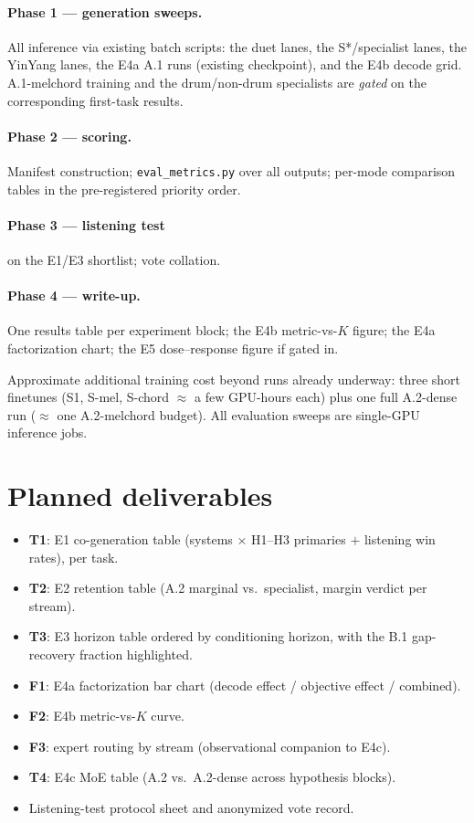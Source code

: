 \documentclass[11pt]{article}
\newcommand{\code}[1]{\texttt{#1}}
\begin{document}
\paragraph{Phase 1 --- generation sweeps.} All inference via existing
batch scripts: the duet lanes, the S*/specialist lanes, the YinYang
lanes, the E4a A.1 runs (existing checkpoint), and the E4b decode
grid. A.1-melchord training and the drum/non-drum specialists are
\emph{gated} on the corresponding first-task results.

\paragraph{Phase 2 --- scoring.} Manifest construction;
\code{eval\_metrics.py} over all outputs; per-mode comparison tables
in the pre-registered priority order.

\paragraph{Phase 3 --- listening test} on the E1/E3 shortlist; vote
collation.

\paragraph{Phase 4 --- write-up.} One results table per experiment
block; the E4b metric-vs-$K$ figure; the E4a factorization chart; the
E5 dose--response figure if gated in.

\medskip
\noindent Approximate additional training cost beyond runs already
underway: three short finetunes (S1, S-mel, S-chord $\approx$ a few
GPU-hours each) plus one full A.2-dense run ($\approx$ one
A.2-melchord budget). All evaluation sweeps are single-GPU inference
jobs.

\section{Planned deliverables}

\begin{itemize}[nosep]
  \item \textbf{T1}: E1 co-generation table (systems $\times$ H1--H3
    primaries $+$ listening win rates), per task.
  \item \textbf{T2}: E2 retention table (A.2 marginal vs.\
    specialist, margin verdict per stream).
  \item \textbf{T3}: E3 horizon table ordered by conditioning
    horizon, with the B.1 gap-recovery fraction highlighted.
  \item \textbf{F1}: E4a factorization bar chart (decode effect /
    objective effect / combined).
  \item \textbf{F2}: E4b metric-vs-$K$ curve.
  \item \textbf{F3}: expert routing by stream (observational
    companion to E4c).
  \item \textbf{T4}: E4c MoE table (A.2 vs.\ A.2-dense across
    hypothesis blocks).
  \item Listening-test protocol sheet and anonymized vote record.
\end{itemize}
\end{document}
